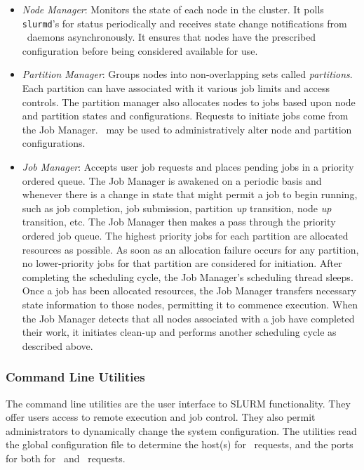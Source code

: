 \begin{itemize}
\item {\em Node Manager}: Monitors the state of each node in
the cluster.  It polls {\tt slurmd}'s for status periodically and
receives state change notifications from \slurmd\ daemons asynchronously.
It ensures that nodes have the prescribed configuration before being 
considered available for use.

\item {\em Partition Manager}: Groups nodes into non-overlapping sets called
{\em partitions}. Each partition can have associated with it various job
limits and access controls.  The partition manager also allocates nodes
to jobs based upon node and partition states and configurations. Requests
to initiate jobs come from the Job Manager.  \scontrol\ may be used
to administratively alter node and partition configurations.

\item {\em Job Manager}: Accepts user job requests and places pending 
jobs in a priority ordered queue. 
The Job Manager is awakened on a periodic basis and whenever there
is a change in state that might permit a job to begin running, such
as job completion, job submission, partition {\em up} transition,
node {\em up} transition, etc.  The Job Manager then makes a pass
through the priority ordered job queue. The highest priority jobs 
for each partition are allocated resources as possible. As soon as an 
allocation failure occurs for any partition, no lower-priority jobs for 
that partition are considered for initiation. 
After completing the scheduling cycle, the Job Manager's scheduling
thread sleeps.  Once a job has been allocated resources, the Job Manager
transfers necessary state information to those nodes, permitting it 
to commence execution.  When the Job Manager detects that
all nodes associated with a job have completed their work, it initiates
clean-up and performs another scheduling cycle as described above.

\end{itemize}

\subsubsection{Command Line Utilities}

The command line utilities are the user interface to SLURM functionality.
They offer users access to remote execution and job control. They also 
permit administrators to dynamically change the system configuration. The 
utilities read the global configuration file
to determine the host(s) for \slurmctld\ requests, and the ports for 
both for \slurmctld\ and \slurmd\ requests. 

